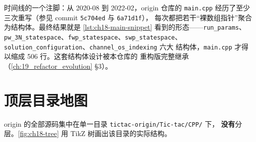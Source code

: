 时间线的一个注脚：从 2020-08 到 2022-02，origin 仓库的 \texttt{main.cpp}
经历了至少三次重写（参见 commit \texttt{5c704ed} 与 \texttt{6a71d1f}），
每次都把若干“裸数组指针”聚合为结构体。最终结果就是
\cref{lst:ch18-main-snippet} 看到的形态——\texttt{run\_params}、
\texttt{pw\_3N\_statespace}、\texttt{fwp\_statespace}、\texttt{swp\_statespace}、
\texttt{solution\_configuration}、\texttt{channel\_os\_indexing} 六大
结构体，\texttt{main.cpp} 才得以缩成 506 行。这套结构体设计被本仓库的
重构版完整继承（\cref{ch:19_refactor_evolution} §3）。

\section{顶层目录地图}
\label{sec:ch18-toplevel}

origin 的全部源码集中在单一目录 \texttt{tictac-origin/Tic-tac/CPP/} 下，
\textbf{没有}分层。\cref{fig:ch18-tree} 用 TikZ 树画出该目录的实际结构。

